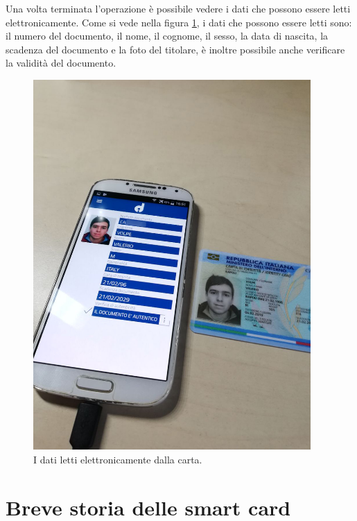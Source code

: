Una volta terminata l'operazione è possibile vedere i dati che possono essere letti elettronicamente. Come si vede nella figura \ref{fig:carta_letta}, i dati che possono essere letti sono: il numero del documento, il nome, il cognome, il sesso, la data di nascita, la scadenza del documento e la foto del titolare, è inoltre possibile anche verificare la validità del documento.

\begin{figure}[h!]
  \centering
  \includegraphics[width=300pt]{pictures/carta_letta.jpg}
  \caption{I dati letti elettronicamente dalla carta.}
  \label{fig:carta_letta}
\end{figure}


\section{Breve storia delle smart card}

    
